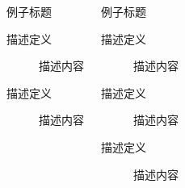 \documentclass[colortheme=light,algorithm,pgfplots]{njubeamer}
\begin{document}
\begin{frame}
\begin{columns}[T,onlytextwidth]
\begin{exampleblock}{例子标题}
\begin{description}
                    \item[描述定义] 描述内容
                    \item[描述定义] 描述内容
                \end{description}
            \end{exampleblock}
            \begin{exampleblock}{例子标题}
                \begin{description}
                    \item[描述定义] 描述内容
                    \item[描述定义] 描述内容
                    \item[描述定义] 描述内容
                \end{description}
            \end{exampleblock}
        \end{columns}
    \end{frame}
\end{document}
